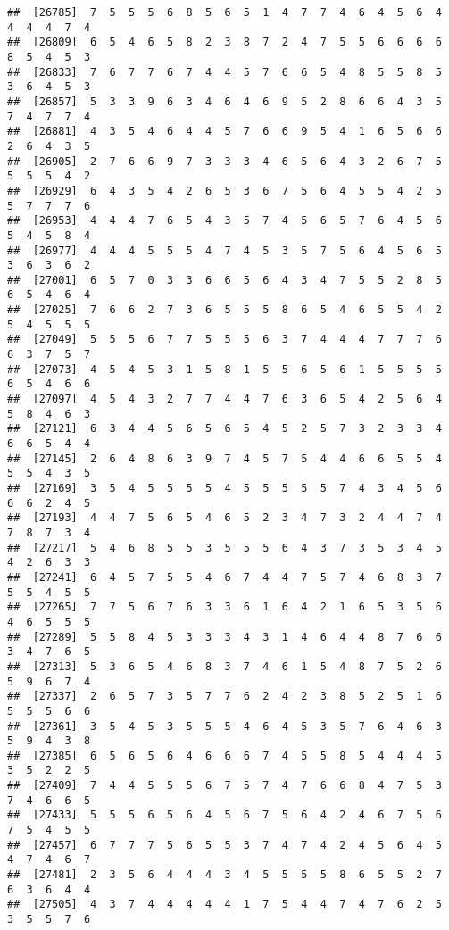 \documentclass[
]{book}
\begin{document}
\begin{verbatim}
##  [26785]  7  5  5  5  6  8  5  6  5  1  4  7  7  4  6  4  5  6  4  4  4  4  7  4
##  [26809]  6  5  4  6  5  8  2  3  8  7  2  4  7  5  5  6  6  6  6  8  5  4  5  3
##  [26833]  7  6  7  7  6  7  4  4  5  7  6  6  5  4  8  5  5  8  5  3  6  4  5  3
##  [26857]  5  3  3  9  6  3  4  6  4  6  9  5  2  8  6  6  4  3  5  7  4  7  7  4
##  [26881]  4  3  5  4  6  4  4  5  7  6  6  9  5  4  1  6  5  6  6  2  6  4  3  5
##  [26905]  2  7  6  6  9  7  3  3  3  4  6  5  6  4  3  2  6  7  5  5  5  5  4  2
##  [26929]  6  4  3  5  4  2  6  5  3  6  7  5  6  4  5  5  4  2  5  5  7  7  7  6
##  [26953]  4  4  4  7  6  5  4  3  5  7  4  5  6  5  7  6  4  5  6  5  4  5  8  4
##  [26977]  4  4  4  5  5  5  4  7  4  5  3  5  7  5  6  4  5  6  5  3  6  3  6  2
##  [27001]  6  5  7  0  3  3  6  6  5  6  4  3  4  7  5  5  2  8  5  6  5  4  6  4
##  [27025]  7  6  6  2  7  3  6  5  5  5  8  6  5  4  6  5  5  4  2  5  4  5  5  5
##  [27049]  5  5  5  6  7  7  5  5  5  6  3  7  4  4  4  7  7  7  6  6  3  7  5  7
##  [27073]  4  5  4  5  3  1  5  8  1  5  5  6  5  6  1  5  5  5  5  6  5  4  6  6
##  [27097]  4  5  4  3  2  7  7  4  4  7  6  3  6  5  4  2  5  6  4  5  8  4  6  3
##  [27121]  6  3  4  4  5  6  5  6  5  4  5  2  5  7  3  2  3  3  4  6  6  5  4  4
##  [27145]  2  6  4  8  6  3  9  7  4  5  7  5  4  4  6  6  5  5  4  5  5  4  3  5
##  [27169]  3  5  4  5  5  5  5  4  5  5  5  5  5  7  4  3  4  5  6  6  6  2  4  5
##  [27193]  4  4  7  5  6  5  4  6  5  2  3  4  7  3  2  4  4  7  4  7  8  7  3  4
##  [27217]  5  4  6  8  5  5  3  5  5  5  6  4  3  7  3  5  3  4  5  4  2  6  3  3
##  [27241]  6  4  5  7  5  5  4  6  7  4  4  7  5  7  4  6  8  3  7  5  5  4  5  5
##  [27265]  7  7  5  6  7  6  3  3  6  1  6  4  2  1  6  5  3  5  6  4  6  5  5  5
##  [27289]  5  5  8  4  5  3  3  3  4  3  1  4  6  4  4  8  7  6  6  3  4  7  6  5
##  [27313]  5  3  6  5  4  6  8  3  7  4  6  1  5  4  8  7  5  2  6  5  9  6  7  4
##  [27337]  2  6  5  7  3  5  7  7  6  2  4  2  3  8  5  2  5  1  6  5  5  5  6  6
##  [27361]  3  5  4  5  3  5  5  5  4  6  4  5  3  5  7  6  4  6  3  5  9  4  3  8
##  [27385]  6  5  6  5  6  4  6  6  6  7  4  5  5  8  5  4  4  4  5  3  5  2  2  5
##  [27409]  7  4  4  5  5  5  6  7  5  7  4  7  6  6  8  4  7  5  3  7  4  6  6  5
##  [27433]  5  5  5  6  5  6  4  5  6  7  5  6  4  2  4  6  7  5  6  7  5  4  5  5
##  [27457]  6  7  7  7  5  6  5  5  3  7  4  7  4  2  4  5  6  4  5  4  7  4  6  7
##  [27481]  2  3  5  6  4  4  4  3  4  5  5  5  5  8  6  5  5  2  7  6  3  6  4  4
##  [27505]  4  3  7  4  4  4  4  4  1  7  5  4  4  7  4  7  6  2  5  3  5  5  7  6

\end{verbatim}
\end{document}
